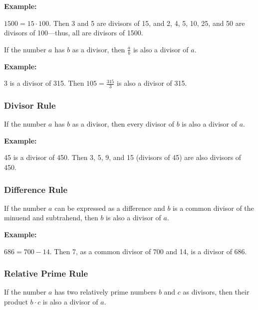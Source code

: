 \textbf{Example:}
\vspace{\baselineskip}

\( 1500 = 15 \cdot 100 \). Then 3 and 5 are divisors of 15, and 2, 4, 5, 10, 25, and 50 are divisors of 
100—thus, all are divisors of 1500.


If the number \(a\) has \(b\) as a divisor, then \( \frac{a}{b} \) is also a divisor of \(a\).
\vspace{\baselineskip}

\textbf{Example:}
\vspace{\baselineskip}
 
3 is a divisor of 315. Then \( 105 = \frac{315}{3} \) is also a divisor of 315.

\subsubsection{Divisor Rule}

If the number \(a\) has \(b\) as a divisor, then every divisor of \(b\) is also a divisor of 
\(a\).
\vspace{\baselineskip}

\textbf{Example:}
\vspace{\baselineskip}
 
45 is a divisor of 450. Then 3, 5, 9, and 15 (divisors of 45) are also divisors of 450.

\subsubsection{Difference Rule}

If the number \(a\) can be expressed as a difference and \(b\) is a common divisor of the minuend 
and subtrahend, then \(b\) is also a divisor of \(a\). \\
\vspace{\baselineskip}

\textbf{Example:}
\vspace{\baselineskip}

\( 686 = 700 - 14 \). Then 7, as a common divisor of 700 and 14, is a divisor of 686.

\subsubsection{Relative Prime Rule}

If the number \(a\) has two relatively prime numbers \(b\) and \( c \) as divisors, then their 
product \( b \cdot c \) is also a divisor of \(a\). \\
\vspace{\baselineskip}

